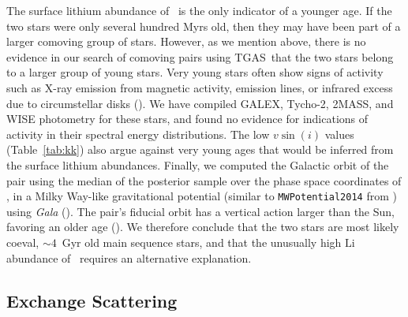 \documentclass[modern, letterpaper]{aastex61}
\newcommand{\project}[1]{\textsl{#1}}
\newcommand{\acronym}[1]{{\small{#1}}}
\newcommand{\tgas}{\acronym{TGAS}}
\newcommand*\elem[1]{\ensuremath{\mathrm{#1}}}
\newcommand{\sunanalog}{\text{Krios}}
\newcommand{\bizarreone}{\text{Kronos}}
\renewcommand\tablename{Table}
\begin{document}
The surface lithium abundance of \bizarreone\ is the only indicator of a
younger age.
If the two stars were only several hundred Myrs old, then
they may have been part of a larger comoving group of stars.
However, as we mention above, there is no evidence in our search of comoving
pairs using \tgas\ that the two stars belong to a larger group of young stars.
Very young stars often show signs of activity such as
X-ray emission from magnetic activity, emission lines, or infrared excess due to
circumstellar disks (\citealt{1999ARA&A..37..363F,1987ApJ...312..788A}).
We have compiled GALEX, Tycho-2, 2MASS, and WISE photometry for these stars,
and found no evidence for indications of activity in their spectral energy
distributions.
%
The low $v\sin(i)$ values (\tablename~\ref{tab:kk}) also argue against very
young ages that would be inferred from the surface lithium abundances.
Finally, we computed the Galactic orbit of the pair using the median of the
posterior sample over the phase space coordinates of \sunanalog, in a Milky
Way-like gravitational potential (similar to \texttt{MWPotential2014} from
\citealt{Bovy:2015}) using \project{Gala} (\citealt{gala}).
The pair's fiducial orbit has a vertical action larger than the Sun, favoring
an older age (\citealt{Wielen:1977,Aumer:2016}).
We therefore conclude that the two stars are most likely coeval, $\sim 4$~Gyr
old main sequence stars, and that the unusually high \elem{Li} abundance of
\bizarreone\ requires an alternative explanation.


\subsection{Exchange Scattering}
\label{sub:exchange_scattering}
\end{document}

